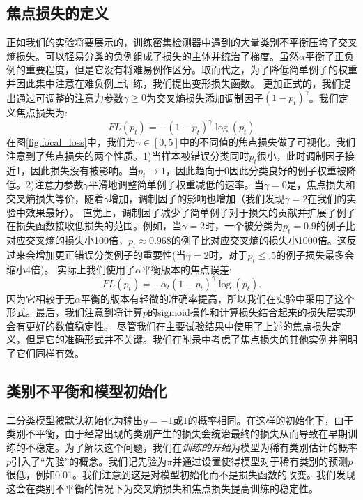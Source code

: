 \documentclass{ctexart}
\begin{document}
\subsection{焦点损失的定义}
正如我们的实验将要展示的，训练密集检测器中遇到的大量类别不平衡压垮了交叉熵损失。可以轻易分类的负例组成了损失的主体并统治了梯度。虽然$\alpha$平衡了正负例的重要程度，但是它没有将难易例作区分。取而代之，为了降低简单例子的权重并因此集中注意在难负例上训练，我们提出变形损失函数。\newline
更加正式的，我们提出通过可调整的注意力参数$\gamma \ge 0$为交叉熵损失添加调制因子$(1-p_t)^\gamma$。我们定义焦点损失为:
\begin{equation}
    FL(p_t)=-(1-p_t)^\gamma\log(p_t)
\end{equation}
在图\ref{fig:focal_loss}中，我们为$\gamma \in [0, 5]$中的不同值的焦点损失做了可视化。我们注意到了焦点损失的两个性质。1)当样本被错误分类同时$p_t$很小，此时调制因子接近1，因此损失没有被影响。当$p_t\rightarrow 1$，因此趋向于0因此分类良好的例子权重被降低。2)注意力参数$\gamma$平滑地调整简单例子权重减低的速率。当$\gamma=0$是，焦点损失和交叉熵损失等价，随着$\gamma$增加，调制因子的影响也增加（我们发现$\gamma=2$在我们的实验中效果最好）。\newline
直觉上，调制因子减少了简单例子对于损失的贡献并扩展了例子在损失函数接收低损失的范围。例如，当$\gamma=2$时，一个被分类为$p_t=0.9$的例子比对应交叉熵的损失小100倍，$p_t\approx 0.968$的例子比对应交叉熵的损失小1000倍。这反过来会增加更正错误分类例子的重要性(当$\gamma = 2$时，对于$p_t \leq .5$的例子损失最多会缩小4倍)。\newline
实际上我们使用了$\alpha$平衡版本的焦点误差:
\begin{equation}
    FL(p_t)=-\alpha_t(1-p_t)^\gamma\log(p_t).
\end{equation}
因为它相较于无$\alpha$平衡的版本有轻微的准确率提高，所以我们在实验中采用了这个形式。最后，我们注意到将计算$p$的sigmoid操作和计算损失结合起来的损失层实现会有更好的数值稳定性。\newline
尽管我们在主要试验结果中使用了上述的焦点损失定义，但是它的准确形式并不关键。我们在附录中考虑了焦点损失的其他实例并阐明了它们同样有效。
\subsection{类别不平衡和模型初始化}
二分类模型被默认初始化为输出$y=-1$或$1$的概率相同。在这样的初始化下，由于类别不平衡，由于经常出现的类别产生的损失会统治最终的损失从而导致在早期训练的不稳定。为了解决这个问题，我们在\textit{训练的开始}为模型为稀有类别估计的概率$p$引入了“先验”的概念。我们记先验为$\pi$并通过设置使得模型对于稀有类别的预测$p$很低，例如0.01。我们注意到这是对模型初始化而不是损失函数的改变。我们发现这会在类别不平衡的情况下为交叉熵损失和焦点损失提高训练的稳定性。
\end{document}
